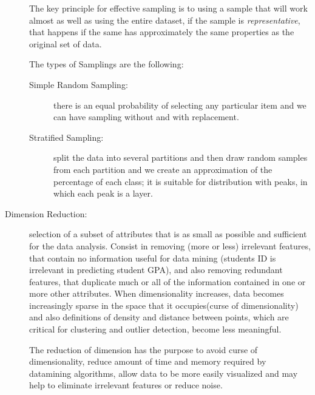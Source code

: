 \begin{description}
                             The key principle for effective sampling is to using a sample that will work
                             almost as well as using the entire dataset, if the sample is \emph{representative},
                             that happens if the same has approximately the same properties as 
                             the original set of data.
                            
                             The types of Samplings are the following:
                             \begin{description}
                                 \item [Simple Random Sampling: ] there is an equal probability of selecting
                                        any particular item and we can have sampling without and with replacement.
                                 \item [Stratified Sampling: ] split the data into several partitions and 
                                        then draw random samples from each partition and we create an
                                        approximation of the percentage of each class; it is suitable 
                                        for distribution with peaks, in which each peak is a layer.
                             \end{description}
    \item [Dimension Reduction: ] selection of a subset of attributes that is as small as possible
                                  and sufficient for the data analysis.\newline
                                  Consist in removing (more or less) irrelevant features, that contain no 
                                  information useful for data mining (students ID is irrelevant in predicting 
                                  student GPA), and also removing redundant features, that duplicate much or 
                                  all of the information contained in one or more other attributes.\newline
                                  When dimensionality increases, data becomes increasingly sparse in the
                                  space that it occupies(curse of dimensionality) and also definitions of
                                  density and distance between points, which are critical for clustering
                                  and outlier detection, become less meaningful.

                                  The reduction of dimension has the purpose to avoid curse of dimensionality,
                                  reduce amount of time and memory required by datamining algorithms, 
                                  allow data to be more easily visualized and 
                                  may help to eliminate irrelevant features or reduce noise.


\end{description}
